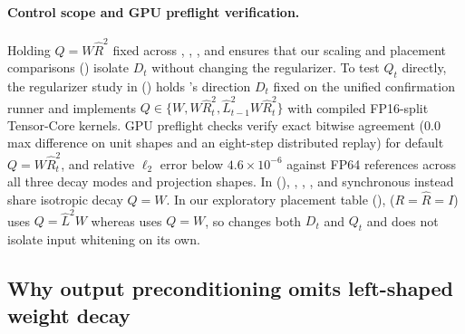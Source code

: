 \paragraph{Control scope and GPU preflight verification.}
Holding $Q=W\hat R^2$ fixed across , , , and  ensures that our scaling and placement comparisons () isolate $D_t$ without changing the regularizer. To test $Q_t$ directly, the regularizer study in  () holds 's direction $D_t$ fixed on the unified confirmation runner and implements $Q\in\{W, W\hat R_t^2, \hat L_{t-1}^2 W\hat R_t^2\}$ with compiled FP16-split Tensor-Core kernels. GPU preflight checks verify exact bitwise agreement ($0.0$ max difference on unit shapes and an eight-step distributed replay) for default $Q=W\hat R_t^2$, and relative $\ell_2$ error below $4.6\times10^{-6}$ against FP64 references across all three decay modes and projection shapes. In  (), , , , and synchronous  instead share isotropic decay $Q=W$. In our exploratory placement table (),  ($R=\hat R=I$) uses $Q=\hat L^2 W$ whereas  uses $Q=W$, so  changes both $D_t$ and $Q_t$ and does not isolate input whitening on its own.

\subsection{Why output preconditioning omits left-shaped weight decay}
\label{app:left_decay_asymmetry}


